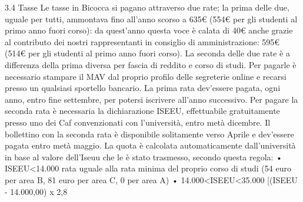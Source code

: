 3.4 Tasse
Le tasse in Bicocca si pagano attraverso due rate; la prima delle due, uguale per tutti, ammontava fino all'anno scorso a 635€ (554€ per gli studenti al primo anno fuori corso): da quest'anno questa voce è calata di 40€ anche grazie al contributo dei nostri rappresentanti in consiglio di amministrazione: 595€ (514€ per gli studenti al primo anno fuori corso). La seconda delle due rate è a differenza della prima diversa per fascia di reddito e corso di studi. 
Per pagarle è necessario stampare il MAV dal proprio profilo delle segreterie online e recarsi presso un qualsiasi sportello bancario. La prima rata dev'essere pagata, ogni anno, entro fine settembre, per potersi iscrivere all'anno successivo. Per pagare la seconda rata è necessaria la dichiarazione ISEEU, effettuabile gratuitamente presso uno dei Caf convenzionati con l'università, entro metà dicembre. 
Il bollettino con la seconda rata è disponibile solitamente verso Aprile e dev'essere pagata entro metà maggio. La quota è calcolata automaticamente dall'università in base al valore dell'Iseuu che le è stato trasmesso, secondo questa regola: 
       • ISEEU<14.000 rata uguale alla rata minima del proprio corso di studi (54 euro per area B, 81 euro per area C, 0 per area A) 
       • 14.000<ISEEU<35.000 [(ISEEU - 14.000,00) x 2,8%
